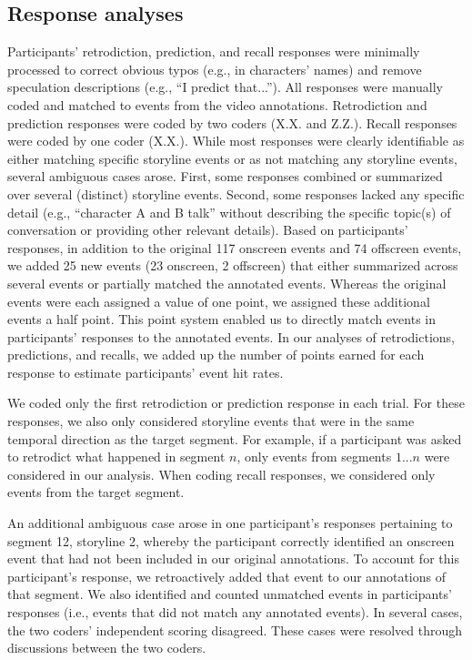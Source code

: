 \documentclass[10pt]{article}
\begin{document}
\subsection*{Response analyses}
Participants' retrodiction, prediction, and recall responses were minimally processed to correct obvious typos (e.g., in characters’ names) and remove speculation descriptions (e.g., ``I predict that...'').  All responses were manually coded and matched to events from the video annotations. Retrodiction and prediction responses were coded by two coders (X.X. and Z.Z.). Recall responses were coded by one coder (X.X.).  While most responses were clearly identifiable as either matching specific storyline events or as not matching any storyline events, several ambiguous cases arose.  First, some responses combined or summarized over several (distinct) storyline events.  Second, some responses lacked any specific detail (e.g., ``character A and B talk'' without describing the specific topic(s) of conversation or providing other relevant details).  Based on participants' responses, in addition to the original 117 onscreen events and 74 offscreen events, we added 25 new events (23 onscreen, 2 offscreen) that either summarized across several events or partially matched the annotated events.  Whereas the original events were each assigned a value of one point, we assigned these additional events a half point.  This point system enabled us to directly match events in participants' responses to the annotated events.  In our analyses of retrodictions, predictions, and recalls, we added up the number of points earned for each response to estimate participants' event hit rates.

We coded only the first retrodiction or prediction response in each trial.  For these responses, we also only considered storyline events that were in the same temporal direction as the target segment.  For example, if a participant was asked to retrodict what happened in segment $n$, only events from segments $1...n$ were considered in our analysis.  When coding recall responses, we considered only events from the target segment.  

An additional ambiguous case arose in one participant's responses pertaining to segment 12, storyline 2, whereby the participant correctly identified an onscreen event that had not been included in our original annotations.  To account for this participant's response, we retroactively added that event to our annotations of that segment.  We also identified and counted unmatched events in participants' responses (i.e., events that did not match any annotated events).  In several cases, the two coders' independent scoring disagreed.  These cases were resolved through discussions between the two coders.
\end{document}
